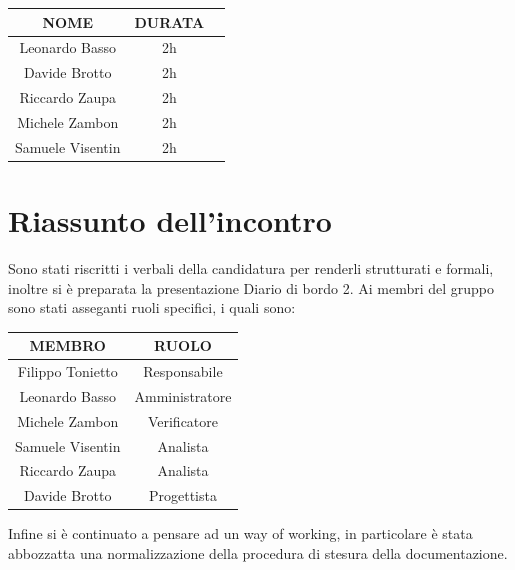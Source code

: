 \documentclass[12pt, oneside]{article}
\begin{document}
\begin{center}
	\begin{tabular}{ | c | c | c | }
		\hline
		NOME & DURATA \\ 
		\hline
		Leonardo Basso & 2h \\  
		\hline 
		Davide Brotto & 2h \\   
        \hline
        Riccardo Zaupa & 2h \\   
		\hline
        Michele Zambon & 2h \\   
        \hline
        Samuele Visentin & 2h \\
        \hline
	\end{tabular}
\end{center}

\section{Riassunto dell'incontro}
Sono stati riscritti i verbali della candidatura per renderli strutturati e formali, inoltre si è preparata la presentazione Diario di bordo 2.
Ai membri del gruppo sono stati asseganti ruoli specifici, i quali sono:
\begin{center}
    \begin{tabular}{|c|c|}
        \hline MEMBRO & RUOLO \\
        \hline
        Filippo Tonietto & Responsabile \\
        \hline
        Leonardo Basso & Amministratore \\
        \hline
        Michele Zambon & Verificatore \\
        \hline
        Samuele Visentin & Analista \\
        \hline
        Riccardo Zaupa & Analista \\
        \hline
        Davide Brotto & Progettista \\
        \hline
    \end{tabular}
\end{center}
Infine si è continuato a pensare ad un way of working, in particolare è stata abbozzatta una normalizzazione della procedura di stesura della documentazione.
\end{document}
